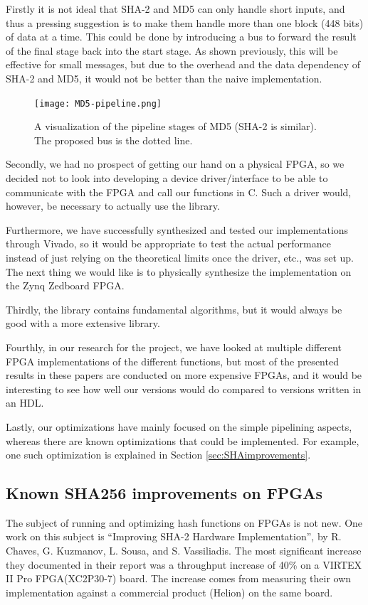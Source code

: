 \documentclass[a4paper, openany]{memoir}
\begin{document}
\begin{abstact}
Firstly it is not ideal that SHA-2 and MD5 can only handle short inputs, and thus a pressing suggestion is to make them handle more than one block (448 bits) of data at a time. This could be done by introducing a bus to forward the result of the final stage back into the start stage. As shown previously, this will be effective for small messages, but due to the overhead and the data dependency of SHA-2 and MD5, it would not be better than the naive implementation.

\begin{figure}[H]
\centering
\texttt{[image: MD5-pipeline.png]}
\caption{A visualization of the pipeline stages of MD5 (SHA-2 is similar). The proposed bus is the dotted line.}
\label{fig:MD5-pipe}
\end{figure}

Secondly, we had no prospect of getting our hand on a physical FPGA, so we decided not to look into developing a device driver/interface to be able to communicate with the FPGA and call our functions in C. Such a driver would, however, be necessary to actually use the library.

Furthermore, we have successfully synthesized and tested our implementations through Vivado, so it would be appropriate to test the actual performance instead of just relying on the theoretical limits once the driver, etc., was set up. The next thing we would like is to physically synthesize the implementation on the Zynq Zedboard FPGA.

Thirdly, the library contains fundamental algorithms, but it would always be good with a more extensive library.

Fourthly, in our research for the project, we have looked at multiple different FPGA implementations of the different functions, but most of the presented results in these papers are conducted on more expensive FPGAs, and it would be interesting to see how well our versions would do compared to versions written in an HDL.

Lastly, our optimizations have mainly focused on the simple pipelining aspects, whereas there are known optimizations that could be implemented. For example, one such optimization is explained in Section \ref{sec:SHAimprovements}.
\subsection{Known SHA256 improvements on FPGAs}
\label{sec:orgadf3806}
\label{sec:SHAimprovements}
The subject of running and optimizing hash functions on FPGAs is not new. One work on this subject is ``Improving SHA-2 Hardware Implementation'', by R. Chaves, G. Kuzmanov, L. Sousa, and S. Vassiliadis.
The most significant increase they documented in their report was a throughput increase of 40\% on a VIRTEX II Pro FPGA(XC2P30-7) board.
The increase comes from measuring their own implementation against a commercial product (Helion) on the same board.


\end{abstact}
\end{document}
